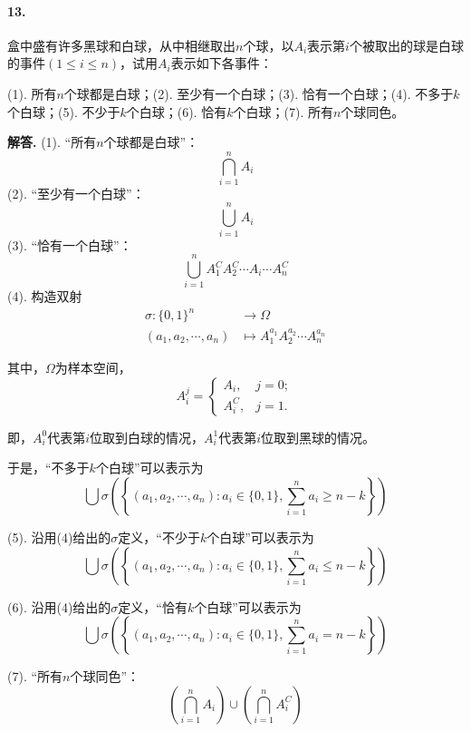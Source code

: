 \documentclass[12pt, a4paper, oneside]{ctexart}
\newenvironment{solution}{\par\noindent\textbf{解答. }}{\bigskip\par}
\begin{document}
\paragraph{13.}盒中盛有许多黑球和白球，从中相继取出$n$个球，以$A_i$表示第$i$个被取出的球是白球的事件$(1\leqslant i\leqslant n)$，试用$A_i$表示如下各事件：

(1). 所有$n$个球都是白球；(2). 至少有一个白球；(3). 恰有一个白球；(4). 不多于$k$个白球；(5). 不少于$k$个白球；(6). 恰有$k$个白球；(7). 所有$n$个球同色。
\begin{solution}
    (1). “所有$n$个球都是白球”：\begin{equation*}
        \bigcap_{i=1}^nA_i
    \end{equation*}
    (2). “至少有一个白球”：\begin{equation*}
        \bigcup_{i=1}^nA_i
    \end{equation*}
    (3). “恰有一个白球”：\begin{equation*}
        \bigcup_{i=1}^nA_1^CA_2^C\cdots A_i\cdots A_n^C
    \end{equation*}
    (4). 构造双射 \begin{equation*}
        \begin{aligned}
            \sigma: \{0, 1\}^n&\rightarrow \Omega\\
            (a_1,a_2,\cdots,a_n)&\mapsto A_1^{a_1}A_2^{a_2}\cdots A_n^{a_n}
        \end{aligned}
    \end{equation*}
    
    其中，$\Omega$为样本空间，\begin{equation*}
        A_i^j=
        \begin{cases}
            A_i, &j=0;\\
            A_i^C, &j=1.
        \end{cases}
    \end{equation*}

    即，$A_i^0$代表第$i$位取到白球的情况，$A_i^1$代表第$i$位取到黑球的情况。

    于是，“不多于$k$个白球”可以表示为\begin{equation*}
        \bigcup\sigma\left(\left\{(a_1,a_2,\cdots,a_n):a_i\in\{0,1\},\sum_{i=1}^na_i\geqslant n-k\right\}\right)
    \end{equation*}

    (5). 沿用(4)给出的$\sigma$定义，“不少于$k$个白球”可以表示为\begin{equation*}
        \bigcup\sigma\left(\left\{(a_1,a_2,\cdots,a_n):a_i\in\{0,1\},\sum_{i=1}^na_i\leqslant n-k\right\}\right)
    \end{equation*}

    (6). 沿用(4)给出的$\sigma$定义，“恰有$k$个白球”可以表示为\begin{equation*}
        \bigcup\sigma\left(\left\{(a_1,a_2,\cdots,a_n):a_i\in\{0,1\},\sum_{i=1}^na_i= n-k\right\}\right)
    \end{equation*}

    (7). “所有$n$个球同色”：\begin{equation*}
        \left(\bigcap_{i=1}^nA_i\right)\cup\left(\bigcap_{i=1}^nA_i^C\right)
    \end{equation*}
\end{solution}
\end{document}
